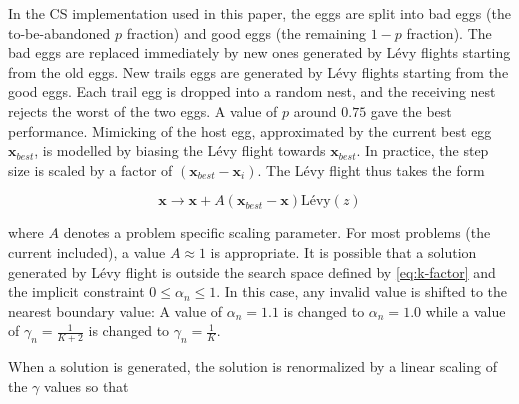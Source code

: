 \documentclass[a4paper, 12pt, sort&compress]{elsarticle}%
\newcommand{\paren}[1]{\left(#1\right)}
\begin{document}

In the CS implementation used in this paper, the eggs are split into
bad eggs (the to-be-abandoned $p$ fraction) and good eggs (the
remaining $1-p$ fraction). The bad eggs are replaced immediately by
new ones generated by Lévy flights starting from the old eggs. New
trails eggs are generated by Lévy flights starting from the good
eggs. Each trail egg is dropped into a random nest, and the receiving
nest rejects the worst of the two eggs. A value of $p$ around $0.75$
gave the best performance. Mimicking of the host egg, approximated by
the current best egg $\boldsymbol x_{best}$, is modelled by biasing
the Lévy flight towards $\boldsymbol x_{best}$. In practice, the step
size is scaled by a factor of
$\paren{\boldsymbol x_{best}- \boldsymbol x_{i}}$. The Lévy flight
thus takes the form

\begin{equation}
  \label{eq:1}
  \boldsymbol x \to \boldsymbol x + A \paren{\boldsymbol x_{best}- \boldsymbol x} \mbox{Lévy}(z) 
\end{equation}

where $A$ denotes a problem specific scaling parameter. For most
problems (the current included), a value $A \approx 1$ is appropriate. It is
possible that a solution generated by Lévy flight is outside the
search space defined by \cref{eq:k-factor} and the implicit constraint
$0 \leq \alpha_{n} \leq 1$. In this case, any invalid value is shifted to
the nearest boundary value: A value of $\alpha_{n} = 1.1$ is changed to
$\alpha_{n} = 1.0$ while a value of $\gamma_{n} = \frac{1}{K+2}$ is changed to
$\gamma_{n} = \frac{1}{K}$.

%
%

When a solution is generated, the solution is renormalized by a linear
scaling of the $\gamma$ values so that
\end{document}
